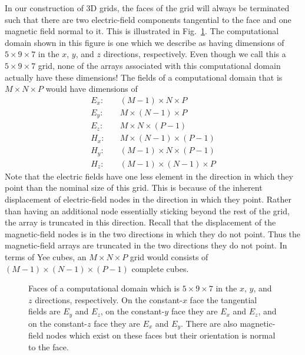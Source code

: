 In our construction of 3D grids, the faces of the grid will always be
terminated such that there are two electric-field components
tangential to the face and one magnetic field normal to it.  This is
illustrated in Fig.\ \ref{fig:faces3d}.  The computational domain
shown in this figure is one which we describe as having dimensions of
$5\times 9\times 7$ in the $x$, $y$, and $z$ directions, respectively.
Even though we call this a $5\times 9\times 7$ grid, none of the
arrays associated with this computational domain actually have these
dimensions!  The fields of a computational domain that is $M\times
N\times P$ would have dimensions of
\begin{align}
E_x: & \quad (M-1) \times N     \times P   \\
E_y: & \quad M     \times (N-1) \times P   \\
E_z: & \quad M     \times N     \times (P-1) \\
H_x: & \quad M     \times (N-1) \times (P-1) \\
H_y: & \quad (M-1) \times N     \times (P-1) \\
H_z: & \quad (M-1) \times (N-1) \times P
\end{align}
Note that the electric fields have one less element in the direction
in which they point than the nominal size of this grid.  This is
because of the inherent displacement of electric-field nodes in the
direction in which they point.  Rather than having an additional node
essentially sticking beyond the rest of the grid, the array is
truncated in this direction.  Recall that the displacement of the
magnetic-field nodes is in the two directions in which they do not
point.  Thus the magnetic-field arrays are truncated in the two
directions they do not point.  In terms of Yee cubes, an $M\times
N\times P$ grid would consists of $(M-1)\times (N-1)\times (P-1)$
complete cubes.

\begin{figure}
  \begin{center}
  \end{center} \caption{Faces of a computational domain which is
  $5\times 9\times 7$ in the $x$, $y$, and $z$ directions,
  respectively.  On the constant-$x$ face the tangential fields are
  $E_y$ and $E_z$, on the constant-$y$ face they are $E_x$ and $E_z$,
  and on the constant-$z$ face they are $E_x$ and $E_y$.  There are also
  magnetic-field nodes which exist on these faces but their orientation
  is normal to the face.}  \label{fig:faces3d}
\end{figure}


